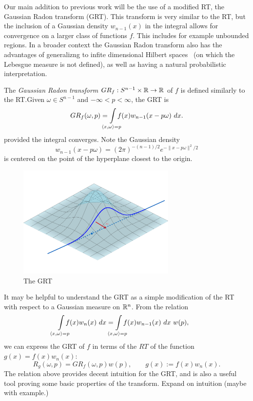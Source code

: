 Our main addition to previous work will be the use of a modified RT, the Gaussian Radon transform (GRT). This transform is very similar to the RT, but the inclusion of a Gaussian density $w_{n-1}(x)$ in the integral allows for convergence on a larger class of functions $f$. This includes for example unbounded regions. In a broader context the Gaussian Radon transform also has the advantages of generalizng to infite dimensional Hilbert spaces~\cite{Seng14} (on which the Lebesgue measure is not defined), as well as having a natural probabilistic interpretation.

\begin{definition}
The \textit{Gaussian Radon transform} $GR_f : S^{n-1} \times \mathbb{R} \rightarrow \mathbb{R}$ of $f$ is defined similarly to the RT.\@ Given $\omega \in S^{n-1}$ and $-\infty < p < \infty$, the GRT is
\[
  GR_f(\omega, p) = 
  \int\mclimits_{\langle x, \omega \rangle = p} f(x) w_{n-1}(x - p\omega) ~dx.
\]
provided the integral converges. Note the Gaussian density 
\[
  w_{n-1}(x - p\omega) = {(2\pi)}^{-(n-1)/2}e^{-\|x - p\omega\|^2/2}
\] 
is centered on the point of the hyperplane closest to the origin.
\end{definition}

\begin{figure}[h]
    \centering
    \includegraphics[width=0.7\textwidth]{Images/GRT.png}
    \caption{The GRT}\label{fig:GRT}
\end{figure}

\begin{remark}
  It may be helpful to understand the GRT as a simple modification of the RT with respect to a Gaussian measure on $\mathbb{R}^n$. From the relation
  \begin{align*}
    \int\mclimits_{\langle x, \omega \rangle = p} f(x) w_n(x) ~dx
    &= \int\mclimits_{\langle x, \omega \rangle = p} f(x) w_{n-1}(x) ~dx~ w(p),
  \end{align*}
  we can express the GRT of $f$ in terms of the $RT$ of the function $g(x) = f(x)w_n(x)$:
  \begin{equation}
    \label{eq:GRTPythag}
    R_g(\omega, p) = GR_f(\omega, p) w(p), \qquad g(x) := f(x)w_n(x).
  \end{equation}
  The relation above provides decent intuition for the GRT, and is also a useful tool proving some basic properties of the transform. Expand on intuition (maybe with example.)
\end{remark}

